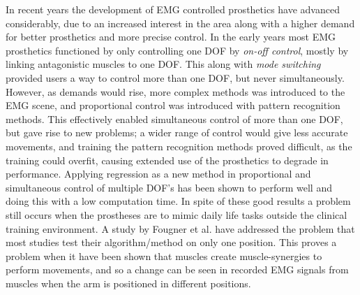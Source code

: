 In recent years the development of EMG controlled prosthetics have advanced considerably, due to an increased interest in the area along with a higher demand for better prosthetics and more precise control. \cite{Fougner2012} In the early years most EMG prosthetics functioned by only controlling one DOF by \textit{on-off control}, mostly by linking antagonistic muscles to one DOF. This along with \textit{mode switching} provided users a way to control more than one DOF, but never simultaneously. However, as demands would rise, more complex methods was introduced to the EMG scene, and proportional control was introduced with pattern recognition methods. This effectively enabled simultaneous control of more than one DOF, but gave rise to new problems; a wider range of control would give less accurate movements, and training the pattern recognition methods proved difficult, as the training could overfit, causing extended use of the prosthetics to degrade in performance. \cite{Ison2016} 
Applying regression as a new method in proportional and simultaneous control of multiple DOF's has been shown to perform well and doing this with a low computation time. \cite{hahne2014} In spite of these good results a problem still occurs when the prostheses are to mimic daily life tasks outside the clinical training environment.  
A study by Fougner et al. \cite{Fougner2011} have addressed the problem that most studies test their algorithm/method on only one position.
This proves a problem when it have been shown that muscles create muscle-synergies to perform movements, and so a change can be seen in recorded EMG signals from muscles when the arm is positioned in different positions. \cite{avella2006, DeRugy2013, Fougner2011} 
